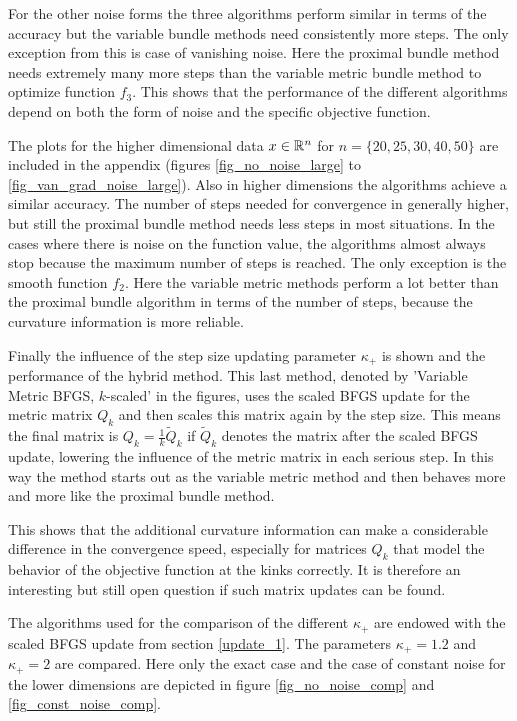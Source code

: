For the other noise forms the three algorithms perform similar in terms of the accuracy but the variable bundle methods need consistently more steps.
The only exception from this is case of vanishing noise. Here the proximal bundle method needs extremely many more steps  than the variable metric bundle method to optimize function \(f_3\). This shows that the performance of the different algorithms depend on both the form of noise and the specific objective function.

The plots for the higher dimensional data \(x \in \mathbb{R}^n\) for \(n = \{20,25,30,40,50\}\) are included in the appendix (figures \ref{fig_no_noise_large} to \ref{fig_van_grad_noise_large}).
Also in higher dimensions the algorithms achieve a similar accuracy. The number of steps needed for convergence in generally higher, but still the proximal bundle method needs less steps in most situations.
In the cases where there is noise on the function value, the algorithms almost always stop because the maximum number of steps is reached. The only exception is the smooth function \(f_2\). Here the variable  metric methods perform a lot better  than the proximal bundle algorithm in terms of the number  of steps, because the curvature information is more reliable.

Finally the influence of the step size updating parameter \(\kappa_+\) is shown and the performance of the hybrid method.
This last method, denoted by 'Variable Metric BFGS, \(k\)-scaled' in the figures, uses the scaled BFGS update for the metric matrix \(Q_k\) and then scales this matrix again by the step size. This means the final matrix is \(Q_k = \frac{1}{k}\tilde{Q}_k\) if \(\tilde{Q}_k\) denotes the matrix after the scaled BFGS update, lowering the influence of the metric matrix in each serious step.
In this way the method starts out as the variable metric method and then behaves more and more like the proximal bundle method.

This shows that the additional curvature information can make a considerable difference in the convergence speed, especially for matrices \(Q_k\) that model the behavior of the objective function at the kinks correctly.
It is therefore an interesting but still open question if such matrix updates can be found.

The algorithms used for the comparison of the different \(\kappa_+\) are endowed with the scaled BFGS update from section \ref{update_1}. The parameters \(\kappa_+ = 1.2\) and \(\kappa_+ = 2\) are compared.
Here only the exact case and the case of constant noise for the lower dimensions are depicted in figure \ref{fig_no_noise_comp} and \ref{fig_const_noise_comp}.%

